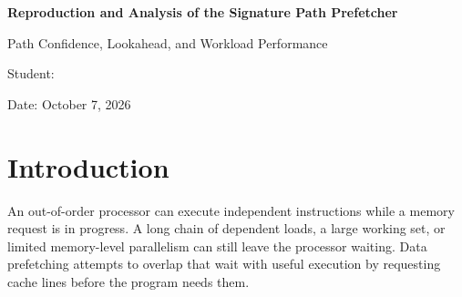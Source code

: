 \documentclass[a4paper,11pt]{article}
\begin{document}
\begin{center}
{\LARGE\bfseries Reproduction and Analysis of the Signature Path Prefetcher}\par
\vspace{9pt}
{\large Path Confidence, Lookahead, and Workload Performance}\par
\vspace{10pt}
Student: \par
Date: October 7, 2026\par
\end{center}

\begin{abstract}
Hardware data prefetching can reduce memory stalls by bringing data into the cache before it is needed. Its effectiveness depends on timely predictions and the resources consumed by additional requests. The Signature Path Prefetcher (SPP) represents recent address deltas with a signature, learns possible continuations, and uses path confidence to control multistep prediction. This report explains the mechanism and evaluates SPP in ChampSim, using no data prefetching and the Best-Offset Prefetcher (BOP) as baselines.

The reproduction uses eight SPEC CPU2006 applications with 200 million warmup instructions and one billion measured instructions. SPP achieves a geometric mean speedup of 1.7445, compared with 1.6679 for BOP. Component experiments on GemsFDTD and libquantum examine the contribution of lookahead and cross-page history. A further comparison measures performance over 500 million and one billion instructions. The evaluation then extends to eight SPEC CPU2017 applications, with two captured windows per application, giving geometric mean speedups of 1.2298 for SPP and 1.2339 for BOP. Component experiments on bwaves and fotonik3d show how the contributions vary between applications. An additional experiment examines confidence thresholds under two memory bandwidth conditions.
\end{abstract}

\clearpage
\tableofcontents
\clearpage

\section{Introduction}
An out-of-order processor can execute independent instructions while a memory request is in progress. A long chain of dependent loads, a large working set, or limited memory-level parallelism can still leave the processor waiting. Data prefetching attempts to overlap that wait with useful execution by requesting cache lines before the program needs them.
\end{document}
